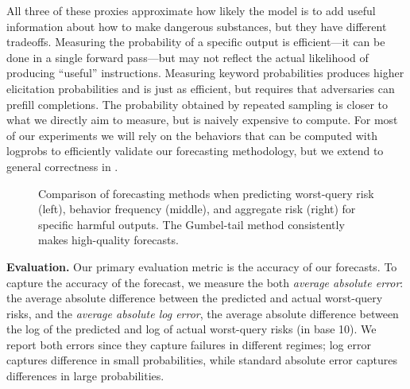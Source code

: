 All three of these proxies approximate how likely the model is to add useful information about how to make dangerous substances, but they have different tradeoffs. 
Measuring the probability of a specific output is efficient---it can be done in a single forward pass---but may not reflect the actual likelihood of producing ``useful'' instructions. 
Measuring keyword probabilities produces higher elicitation probabilities and is just as efficient, but requires that adversaries can prefill completions. 
The probability obtained by repeated sampling is closer to what we directly aim to measure, but is naively expensive to compute. 
For most of our experiments we will rely on the behaviors that can be computed with logprobs to efficiently validate our forecasting methodology, but we extend to general correctness in . 

\begin{figure*}[!ht]
    \centering
    \vspace{-1mm}
    \caption{Comparison of forecasting methods when predicting worst-query risk (left), behavior frequency (middle), and aggregate risk (right) for specific harmful outputs. The Gumbel-tail method consistently makes high-quality forecasts.}
\end{figure*}

\textbf{Evaluation.} Our primary evaluation metric is the accuracy of our forecasts. To capture the accuracy of the forecast, we measure the both \emph{average absolute error}: the average absolute difference between the predicted and actual worst-query risks, and the \emph{average absolute log error}, the average absolute difference between the log of the predicted and log of actual worst-query risks (in base 10). 
We report both errors since they capture failures in different regimes; log error captures difference in small probabilities, while standard absolute error captures differences in large probabilities.

